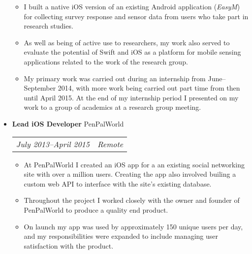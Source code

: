 \documentclass[letterpaper]{article}
\begin{document}
\begin{itemize}
\begin{itemize}
            \item I built a native iOS version of an existing Android
                application (\emph{EasyM}) for collecting survey response and
                sensor data from users who take part in research studies.

            \item As well as being of active use to researchers, my work also
                served to evaluate the potential of Swift and iOS as a platform
                for mobile sensing applications related to the work of the
                research group.

            \item My primary work was carried out during an internship from
                June--September 2014, with more work being carried out part time
                from then until April 2015. At the end of my internship period I
                presented on my work to a group of academics at a research group
                meeting.

		\end{itemize}
	
    \item \textbf{Lead iOS Developer} PenPalWorld \\
		\begin{tabular}{c|c}
			\emph{July 2013--April 2015} & \emph{Remote}
		\end{tabular}
		\begin{itemize}

            \item At PenPalWorld I created an iOS app for a an existing social
                networking site with over a million users. Creating the app also
                involved builing a custom web API to interface with the site's
                existing database.

            \item Throughout the project I worked closely with the owner
                and founder of PenPalWorld to produce a quality end product.

            \item On launch my app was used by approximately 150 unique users
                per day, and my responsibilities were expanded to include
                managing user satisfaction with the product.

\end{itemize}
	
%
%
	

\end{itemize}
\end{document}
